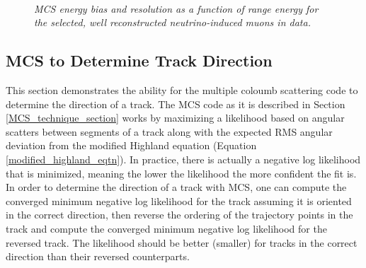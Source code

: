 \begin{figure}
\centering
\mbox{
	\quad
	}
\caption{\textit{MCS energy bias and resolution as a function of range energy for the selected, well reconstructed neutrino-induced muons in {\ub} data.}}
\label{seglenstudy_bias_resolution_DataRecoTrack_fig}
\end{figure}





\subsection{MCS to Determine Track Direction}\label{TrackDirection_DataRecoTrack_section}
This section demonstrates the ability for the multiple coloumb scattering code to determine the direction of a track. The MCS code as it is described in Section \ref{MCS_technique_section} works by maximizing a likelihood based on angular scatters between segments of a track along with the expected RMS angular deviation from the modified Highland equation (Equation \ref{modified_highland_eqtn}). In practice, there is actually a negative log likelihood that is minimized, meaning the lower the likelihood the more confident the fit is. In order to determine the direction of a track with MCS, one can compute the converged minimum negative log likelihood for the track assuming it is oriented in the correct direction, then reverse the ordering of the trajectory points in the track and compute the converged minimum negative log likelihood for the reversed track. The likelihood should be better (smaller) for tracks in the correct direction than their reversed counterparts.\\

